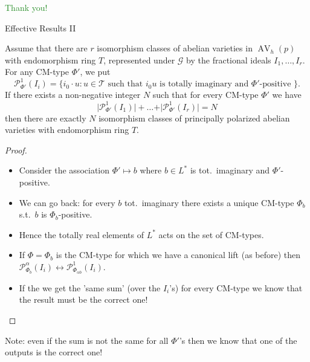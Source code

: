 \documentclass[usenames,dvipsnames,handout]{beamer}
\DeclareMathOperator{\AV}{AV}
\newcommand{\cG}{\mathcal{G}}
\newcommand{\Palpha}[2]{\mathcal{P}^{\alpha}_{{#1}}({#2})}
\newcommand{\Pone}[2]{\mathcal{P}^{1}_{{#1}}({#2})}
\newcommand{\green}[1]{\textcolor{ForestGreen}{#1}}
\begin{document}
\begin{frame}{  }
    \begin{center}
    \green{\huge Thank you!}
    \end{center}  
\end{frame}

\begin{frame}[noframenumbering]{ Effective Results II }
	\begin{theorem}[2]
    Assume that there are $r$ isomorphism classes of abelian varieties in $\AV_h(p)$ with endomorphism ring $T$, represented under $\cG$ by the fractional ideals  $I_1,\ldots,I_r$.
    For any CM-type $\Phi'$, we put
		\[ \Pone{\Phi'}{I_i}=\{ i_0 \cdot u: u \in \mathcal{T} \text{ such that } i_0 u \text{ is totally imaginary and $\Phi'$-positive } \}. \]
    If there exists a non-negative integer $N$ such that for every CM-type $\Phi'$ we have
    \[
    \vert \Pone{\Phi'}{I_1} \vert + \ldots + \vert \Pone{\Phi'}{I_r} \vert = N
    \]
    then there are exactly $N$ isomorphism classes of principally polarized abelian varieties with endomorphism ring $T$. 
	\end{theorem}
\end{frame}

\begin{frame}[noframenumbering]{ }
    \begin{proof}
    \begin{itemize}
    \item Consider the association $\Phi'\mapsto b$ where $b\in L^*$ is tot.~imaginary and $\Phi'$-positive.
    \item We can go back: for every $b$ tot.~imaginary there exists a unique CM-type $\Phi_b$ s.t.~$b$ is $\Phi_b$-positive.
    \item Hence the totally real elements of $L^*$ acts on the set of CM-types.
    \item If $\Phi=\Phi_{b}$ is the CM-type for which we have a canonical lift (as before)
        then $\Palpha{\Phi_b}{I_i} \longleftrightarrow \Pone{\Phi_{\alpha b}}{I_i}$.
    \item If the we get the 'same sum' (over the $I_i$'s) for every CM-type we know that the result must be the correct one! 
    \end{itemize}
    \end{proof} 
    Note: even if the sum is not the same for all $\Phi'$'s then we know that one of the outputs is the correct one!
\end{frame}
\end{document}
